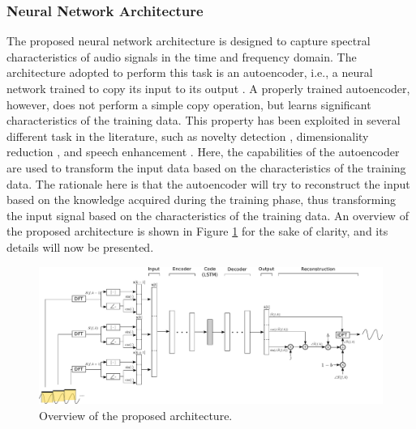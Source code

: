 \subsubsection{Neural Network Architecture}
The proposed neural network architecture is designed to capture spectral characteristics of audio signals in the time and frequency domain. The architecture adopted to perform this task is an autoencoder, i.e., a neural network trained to copy its input to its output \cite{Goodfellow2016BookChap14}. A properly trained autoencoder, however, does not perform a simple copy operation, but learns significant characteristics of the training data. This property has been exploited in several different task in the literature, such as novelty detection \cite{Principi17a}, dimensionality reduction \cite{Hinton2006reducing}, and speech enhancement \cite{Lu2013speech}. Here, the capabilities of the autoencoder are used to transform the input data based on the characteristics of the training data. The rationale here is that the autoencoder will try to reconstruct the input based on the knowledge acquired during the training phase, thus transforming the input signal based on the characteristics of the training data. An overview of the proposed architecture is shown in Figure \ref{fig:modello} for the sake of clarity, and its details will now be presented.

\begin{figure}[t]
	\centering
	\includegraphics[width=\textwidth]{img/audioXsynth/architecture}

%	
	\caption{Overview of the proposed architecture.}
	\label{fig:modello}
\end{figure}

